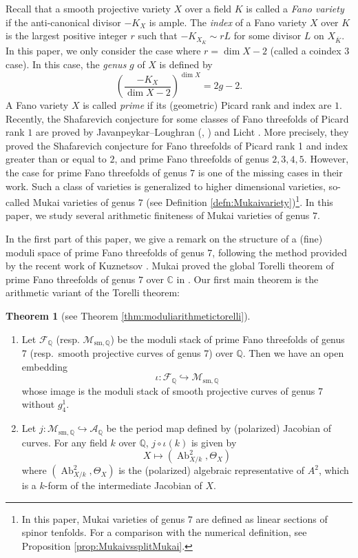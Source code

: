 \documentclass[autodetect-engine, a4paper]{amsart}
\theoremstyle{definition}
\newtheorem{thm}{Theorem}[section]
\def\Q{{\mathbb Q}}
\def\C{{\mathbb C}}
\DeclareMathOperator\Ab{\mathrm{Ab}}
\newcommand{\cred}{\color{black}}
\begin{document}
Recall that a smooth projective variety $X$ over a field $K$ is called a \emph{Fano variety} if the anti-canonical divisor $-K_{X}$ is ample.
{\cred The \emph{index} of a Fano variety $X$ over $K$ is the 
largest positive integer $r$ such that $- K_{X_{\overline{K}}} \sim r L$ for some divisor $L$ on $X_{\overline{K}}$.
In this paper, we only consider the case where $r = \dim X -2$ (called a coindex $3$ case).
In this case, the \emph{genus} $g$ of $X$ is defined by 
\[
\left( \frac{-K_{X}}{\dim X -2} \right)^{\dim X} = 2g-2.
\]}
A Fano variety $X$ is called \emph{prime} if its (geometric) Picard rank and index are $1$.
Recently, the Shafarevich conjecture for
some classes of Fano threefolds of Picard rank $1$ are proved by Javanpeykar--Loughran (\cite{Javanpeykar-Loughran:GoodReductionFano}, \cite{Javanpeykar-Loughran:completeintersection})
and Licht \cite{Licht}.
More precisely, they proved the Shafarevich conjecture for Fano threefolds of Picard rank 1 and index greater than or equal to $2$, and prime Fano threefolds of genus $2,3,4,5$.
However, the case for prime Fano threefolds of genus $7$ is one of the missing cases in their work.
Such a class of varieties is generalized to higher dimensional varieties, so-called Mukai varieties of genus $7$ (see Definition \ref{defn:Mukaivariety})\footnote{In this paper, Mukai varieties of genus $7$ are defined as linear sections of spinor tenfolds. For a comparison with the numerical definition, see Proposition \ref{prop:MukaivssplitMukai}.}.
In this paper, we study several arithmetic finiteness of Mukai varieties of genus $7$.

In the first part of this paper, we give a remark on the structure of a (fine) moduli space of prime Fano threefolds of genus 7, following the method provided by the recent work of Kuznetsov \cite{Kuznetsovfamily}.
Mukai proved the global Torelli theorem of prime Fano threefolds of genus $7$ over $\C$ in \cite{MukaiBrill}.
Our first main theorem is the arithmetic variant of the Torelli theorem:

\begin{thm}[see Theorem \ref{thm:moduliarithmetictorelli}]
\label{thm:introarithmeticTorelli}
\begin{enumerate}
\item
Let $\mathcal{F}_{\Q}$ (resp. $\mathcal{M}_{\mathrm{sm}, \Q}$) be the moduli stack of prime Fano threefolds of genus 7 (resp.\ smooth projective curves of genus 7) over $\Q$. 
Then we have an open embedding
\[
\iota
\colon
\mathcal{F}_{\Q} \hookrightarrow \mathcal{M}_{\mathrm{sm}, \Q}
\]
whose image is the moduli stack of smooth projective curves of genus 7 without $g_4^1$.
\item 
Let $j \colon \mathcal{M}_{\mathrm{sm}, \Q} \hookrightarrow \mathcal{A}_{\Q}$
be the period map defined by (polarized) Jacobian of curves.
For any field $k$ over $\Q$, $j \circ \iota (k)$ is given by 
\[
X \mapsto (\Ab^2_{X/k}, \Theta_{X})
\]
where $(\Ab^2_{X/k}, \Theta_{X})$ is the (polarized) algebraic representative of $A^2$, which is a $k$-form of the intermediate Jacobian of $X$.
\end{enumerate}
\end{thm}
\end{document}
